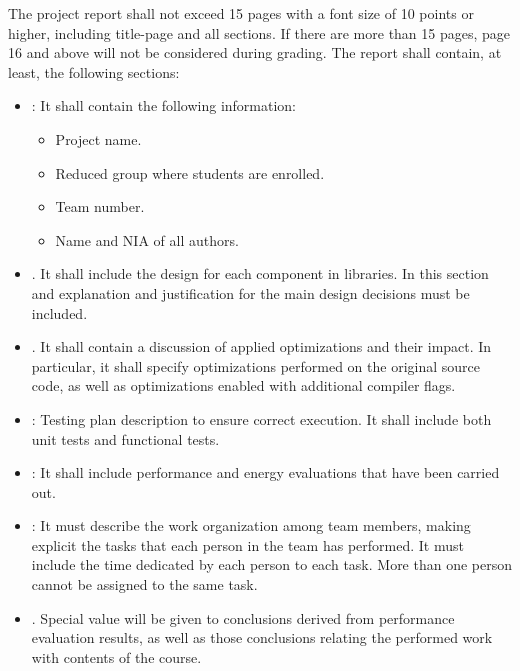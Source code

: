 The project report shall not exceed 15 pages with a font size of 10 points
or higher, including title-page and all sections. If there are more than
15 pages, page 16 and above will not be considered during grading.
The report shall contain, at least, the following sections:

\begin{itemize}

\item {}: It shall contain the following information:
  \begin{itemize}
    \item Project name.
    \item Reduced group where students are enrolled.
    \item Team number.
    \item Name and NIA of all authors.
  \end{itemize}

\item {}. 
      It shall include the design for each component in libraries.
      In this section and explanation and justification for the main
      design decisions must be included.

\item {}. 
      It shall contain a discussion of applied optimizations and their
      impact. In particular, it shall specify optimizations performed
      on the original source code, as well as optimizations enabled
      with additional compiler flags.

\item {}: 
      Testing plan description to ensure correct execution.
      It shall include both unit tests and functional tests.

\item {}:
      It shall include performance and energy evaluations that have been
      carried out.

\item {}:
      It must describe the work organization among team members, 
      making explicit the tasks that each person in the team has performed.
      It must include the time dedicated by each person to each task.
      More than one person cannot be assigned to the same task.

\item {}.
      Special value will be given to conclusions derived from performance evaluation
      results, as well as those conclusions relating the performed work with
      contents of the course.

\end{itemize}

